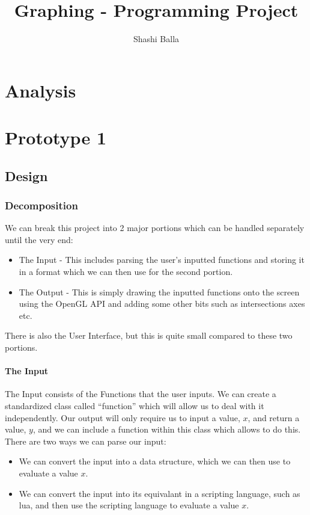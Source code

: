 \documentclass{report}
\author{Shashi Balla}
\title{Graphing - Programming Project}
\begin{document}
\maketitle

\tableofcontents
\newpage

\part{Analysis}


\part{Prototype 1}

\chapter{Design}

\section{Decomposition}
We can break this project into 2 major portions which can be handled separately until the very end:
\begin{itemize}
	\item The Input - This includes parsing the user's inputted functions and storing it in a format which we can then use for the second portion.
	\item The Output - This is simply drawing the inputted functions onto the screen using the OpenGL API and adding some other bits such as intersections axes etc.
\end{itemize}
There is also the User Interface, but this is quite small compared to these two portions.
\subsection{The Input}
The Input consists of the Functions that the user inputs. We can create a standardized class called ``function''  which will allow us to deal with it independently. Our output will only require us to input a value, $x$, and return a value, $y$, and we can include a function within this class which allows to do this. There are two ways we can parse our input:
\begin{itemize}
	\item We can convert the input into a data structure, which we can then use to evaluate a value $x$.
	\item We can convert the input into its equivalant in a scripting language, such as lua, and then use the scripting language to evaluate a value $x$.
\end{itemize}
\end{document}
